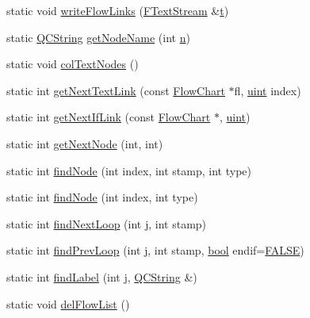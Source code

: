 \begin{DoxyCompactItemize}
\item 
static void \hyperlink{class_flow_chart_ae4183bb824a2bc2246ee910aeb6a8272}{write\+Flow\+Links} (\hyperlink{class_f_text_stream}{F\+Text\+Stream} \&\hyperlink{058__bracket__recursion_8tcl_a69e959f6901827e4d8271aeaa5fba0fc}{t})
\item 
static \hyperlink{class_q_c_string}{Q\+C\+String} \hyperlink{class_flow_chart_aa01a87c51143a53315d534acc1340693}{get\+Node\+Name} (int \hyperlink{060__command__switch_8tcl_acdde3cd86eb2421ce8dbb2e85227d368}{n})
\item 
static void \hyperlink{class_flow_chart_a6fc7dfce3416355a82991f015431b854}{col\+Text\+Nodes} ()
\item 
static int \hyperlink{class_flow_chart_afbabb1015cce9beed9ff096f9cf91f5a}{get\+Next\+Text\+Link} (const \hyperlink{class_flow_chart}{Flow\+Chart} $\ast$fl, \hyperlink{qglobal_8h_a4d3943ddea65db7163a58e6c7e8df95a}{uint} index)
\item 
static int \hyperlink{class_flow_chart_a5b569cff427ed07284b8a712775df4c9}{get\+Next\+If\+Link} (const \hyperlink{class_flow_chart}{Flow\+Chart} $\ast$, \hyperlink{qglobal_8h_a4d3943ddea65db7163a58e6c7e8df95a}{uint})
\item 
static int \hyperlink{class_flow_chart_a640c488456976d684b1eddedf05a42d2}{get\+Next\+Node} (int, int)
\item 
static int \hyperlink{class_flow_chart_a72b7f05a1b0f8638799d039df1d8b1ed}{find\+Node} (int index, int stamp, int type)
\item 
static int \hyperlink{class_flow_chart_a51740512cf2ac6cb8011bd99438bffc7}{find\+Node} (int index, int type)
\item 
static int \hyperlink{class_flow_chart_a2d2e047c2e013947c1d61b4c61bd9e54}{find\+Next\+Loop} (int \hyperlink{060__command__switch_8tcl_a2aaa92757686acea102cba3475f0c13b}{j}, int stamp)
\item 
static int \hyperlink{class_flow_chart_a1dec94e1f2202f648d696b1d68b1f9c9}{find\+Prev\+Loop} (int \hyperlink{060__command__switch_8tcl_a2aaa92757686acea102cba3475f0c13b}{j}, int stamp, \hyperlink{qglobal_8h_a1062901a7428fdd9c7f180f5e01ea056}{bool} endif=\hyperlink{qglobal_8h_a10e004b6916e78ff4ea8379be80b80cc}{F\+A\+L\+S\+E})
\item 
static int \hyperlink{class_flow_chart_a4c13c6501c1d5ce82db5fdc7007582d6}{find\+Label} (int \hyperlink{060__command__switch_8tcl_a2aaa92757686acea102cba3475f0c13b}{j}, \hyperlink{class_q_c_string}{Q\+C\+String} \&)
\item 
static void \hyperlink{class_flow_chart_a64f98636bae1290688ea4bc06d02e86f}{del\+Flow\+List} ()

\end{DoxyCompactItemize}
